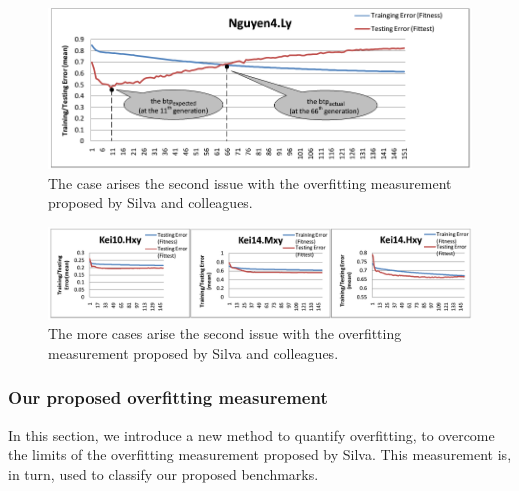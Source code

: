 \begin{enumerate}
\begin{figure}
\centering
\includegraphics[scale=0.4]{Figures/Fig3_2.png}
\caption{The case arises the second issue with the overfitting measurement proposed by Silva and colleagues.}
\label{fig:issue2.1}       %
\end{figure}

\begin{figure}
\centering
\includegraphics[scale=0.4]{Figures/Fig3_3.png}
\caption{The more cases arise the second issue with the overfitting measurement proposed by Silva and colleagues.}
\label{fig:issue2.2}       %
\end{figure}


\subsubsection{Our proposed overfitting measurement}
In this section, we introduce a new method to quantify overfitting, to overcome the limits of the overfitting measurement proposed by Silva. This measurement is, in turn, used to classify our proposed benchmarks.


\end{enumerate}
